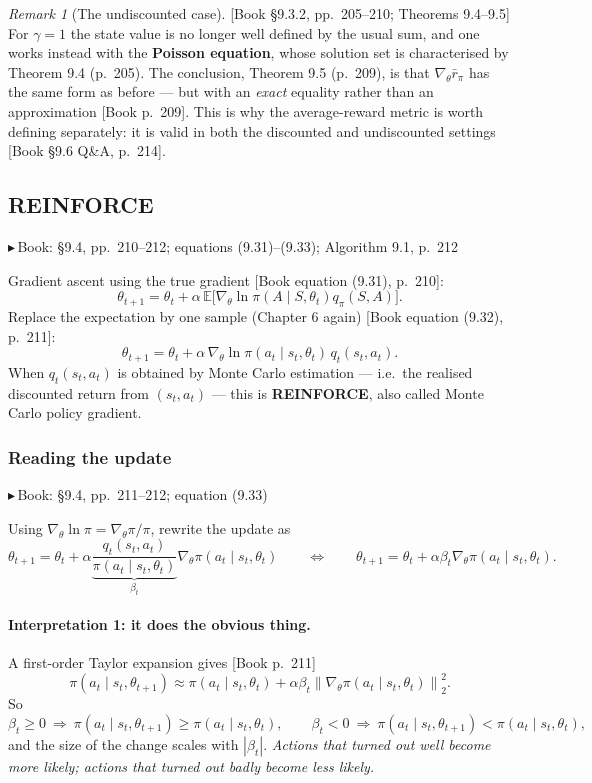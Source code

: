 \documentclass[11pt, letterpaper]{article}
\theoremstyle{runin}
\theoremstyle{runinplain}
\theoremstyle{remark}
\newtheorem*{remark}{Remark}
\newcommand{\E}{\mathbb{E}}
\newcommand{\norm}[1]{\left\lVert #1 \right\rVert}
\newcommand{\bk}[1]{{\color{bookblue}\small$\blacktriangleright$\,\textsf{Book: #1}}}
\newcommand{\bkin}[1]{{\color{bookblue}\small[\textsf{Book #1}]}}
\begin{document}
\begin{remark}[The undiscounted case]
\bkin{\S9.3.2, pp.~205--210; Theorems 9.4--9.5} For $\gamma=1$ the state value is no
longer well defined by the usual sum, and one works instead with the \textbf{Poisson
equation}, whose solution set is characterised by Theorem 9.4 (p.~205). The
conclusion, Theorem 9.5 (p.~209), is that $\nabla_\theta\bar r_\pi$ has the same
form as before --- but with an \emph{exact} equality rather than an approximation
\bkin{p.~209}. This is why the average-reward metric is worth defining separately:
it is valid in both the discounted and undiscounted settings
\bkin{\S9.6 Q\&A, p.~214}.
\end{remark}

\subsection{REINFORCE}

\bk{\S9.4, pp.~210--212; equations (9.31)--(9.33); Algorithm 9.1, p.~212}

Gradient ascent using the true gradient \bkin{equation (9.31), p.~210}:
\[
  \theta_{t+1}=\theta_t+\alpha\,\E\bigl[\nabla_\theta\ln\pi(A\mid S,\theta_t)q_\pi(S,A)\bigr].
\]
Replace the expectation by one sample (Chapter 6 again)
\bkin{equation (9.32), p.~211}:
\[
  \boxed{\;\theta_{t+1}=\theta_t+\alpha\,\nabla_\theta\ln\pi(a_t\mid s_t,\theta_t)\,q_t(s_t,a_t).\;}
\]
When $q_t(s_t,a_t)$ is obtained by Monte Carlo estimation --- i.e.\ the realised
discounted return from $(s_t,a_t)$ --- this is \textbf{REINFORCE}, also called Monte
Carlo policy gradient.

\subsubsection{Reading the update}

\bk{\S9.4, pp.~211--212; equation (9.33)}

Using $\nabla_\theta\ln\pi=\nabla_\theta\pi/\pi$, rewrite the update as
\[
  \theta_{t+1}=\theta_t+\alpha\underbrace{\frac{q_t(s_t,a_t)}{\pi(a_t\mid s_t,\theta_t)}}_{\beta_t}
    \nabla_\theta\pi(a_t\mid s_t,\theta_t)
  \qquad\Longleftrightarrow\qquad
  \theta_{t+1}=\theta_t+\alpha\beta_t\nabla_\theta\pi(a_t\mid s_t,\theta_t).
  \tag{9.33}
\]

\paragraph{Interpretation 1: it does the obvious thing.} A first-order Taylor
expansion gives \bkin{p.~211}
\[
  \pi(a_t\mid s_t,\theta_{t+1})\approx\pi(a_t\mid s_t,\theta_t)
   +\alpha\beta_t\norm{\nabla_\theta\pi(a_t\mid s_t,\theta_t)}_2^2 .
\]
So
\[
  \beta_t\ge0\ \Longrightarrow\ \pi(a_t\mid s_t,\theta_{t+1})\ge\pi(a_t\mid s_t,\theta_t),
  \qquad
  \beta_t<0\ \Longrightarrow\ \pi(a_t\mid s_t,\theta_{t+1})<\pi(a_t\mid s_t,\theta_t),
\]
and the size of the change scales with $|\beta_t|$. \emph{Actions that turned out
well become more likely; actions that turned out badly become less likely.}
\end{document}
